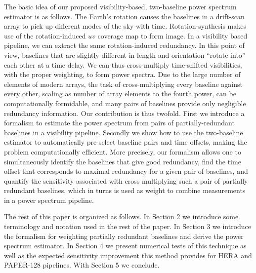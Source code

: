 \documentclass[twocolumn,apj,numberedappendix]{emulateapj}
\renewcommand\[{\begin{equation}}
\renewcommand\]{\end{equation}}
\begin{document}
The basic idea of our proposed visibility-based, two-baseline power spectrum estimator is as follows. The Earth's rotation causes the baselines in a drift-scan array to pick up different modes of the sky with time. Rotation-synthesis makes use of the rotation-induced $uv$ coverage map to form image. In a visibility based pipeline, we can extract the same rotation-induced redundancy. In this point of view, baselines that are slightly different in length and orientation
``rotate into'' each other at a time delay. We can thus cross-multiply time-shifted visibilities, with the proper weighting, to form power spectra.  Due to the large number of elements of modern arrays, the task of cross-multiplying every baseline against every other, scaling as number of array elements to the fourth power, can be computationally formidable, and many pairs of baselines provide only negligible redundancy information. Our contribution is thus twofold. First we introduce a formalism to estimate the power spectrum from pairs of partially-redundant baselines in a visibility pipeline. Secondly we show how to use the two-baseline estimator to automatically pre-select baseline pairs and time offsets, making the problem computationally efficient. More precisely, our formalism allows one to simultaneously identify the baselines that give good
redundancy, find the time offset that corresponds to maximal redundancy for a given pair of baselines, and quantify the sensitivity associated with cross multiplying
such a pair of partially redundant baselines, which in turns is used as weight to combine measurements in a power spectrum pipeline. 




The rest of this paper is organized as follows. In Section 2 we introduce some terminology and notation used in the rest of the paper. In Section
3 we introduce the formalism for weighting partially redundant baselines and derive the power spectrum estimator.
In Section 4 we present numerical tests of
this technique as well as the expected sensitivity improvement
 this method provides for HERA and PAPER-128 pipelines. With Section 5 we conclude. 
\end{document}

